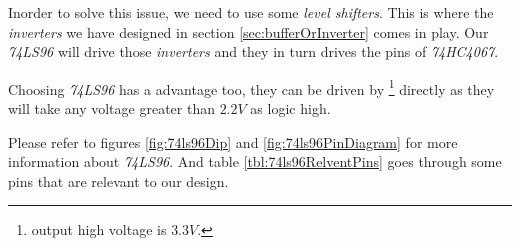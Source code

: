 \documentclass[../../main]{subfiles}
\begin{document}
Inorder to solve this issue, we need to use some \emph{level shifters}. This is where the
\emph{inverters} we have designed in section \ref{sec:bufferOrInverter} comes in play.
Our \emph{74LS96} will drive those \emph{inverters} and they in turn drives the pins of
\emph{74HC4067}.

Choosing \emph{74LS96} has a advantage too, they can be driven by \esp\footnote{output high voltage is
$3.3\si{V}$.} directly as they will take any voltage greater than $2.2\si{V}$ as logic high.

Please refer to figures \ref{fig:74ls96Dip} and \ref{fig:74ls96PinDiagram} for more information about
\emph{74LS96}. And table \ref{tbl:74ls96RelventPins} goes through some pins that are relevant to
our design.


\end{document}
